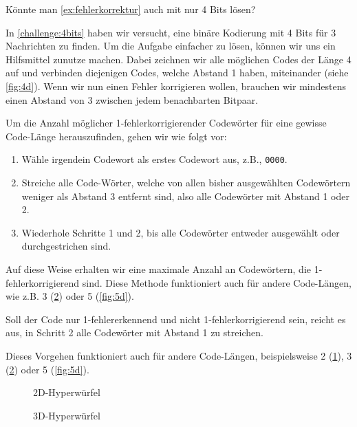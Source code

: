 \begin{mychallenge}\label{challenge:4bits}
    Könnte man \cref{ex:fehlerkorrektur} auch mit nur 4 Bits lösen?
\end{mychallenge}


In \cref{challenge:4bits} haben wir versucht, eine binäre Kodierung mit 4 Bits für 3 Nachrichten zu finden. Um die Aufgabe einfacher zu lösen, können wir uns ein Hilfsmittel zunutze machen. Dabei zeichnen wir alle möglichen Codes der Länge 4 auf und verbinden diejenigen Codes, welche Abstand 1 haben, miteinander (siehe \cref{fig:4d}). Wenn wir nun einen Fehler korrigieren wollen, brauchen wir mindestens einen Abstand von 3 zwischen jedem benachbarten Bitpaar.

\begin{mydefinition}
Um die Anzahl möglicher 1-fehlerkorrigierender Codewörter für eine gewisse Code-Länge herauszufinden, gehen wir wie folgt vor:
\begin{enumerate}
    \item Wähle irgendein Codewort als erstes Codewort aus, z.B., \texttt{0000}.
    \item Streiche alle Code-Wörter, welche von allen bisher ausgewählten Codewörtern weniger als Abstand 3 entfernt sind, also alle Codewörter mit Abstand 1 oder 2.
    \item Wiederhole Schritte 1 und 2, bis alle Codewörter entweder ausgewählt oder durchgestrichen sind.
\end{enumerate}
Auf diese Weise erhalten wir eine maximale Anzahl an Codewörtern, die 1-fehlerkorrigierend sind. Diese Methode funktioniert auch für andere Code-Längen, wie z.B. 3 (\cref{fig:3d}) oder 5 (\cref{fig:5d}).

Soll der Code nur 1-fehlererkennend und nicht 1-fehlerkorrigierend sein, reicht es aus, in Schritt 2 alle Codewörter mit Abstand 1 zu streichen.

Dieses Vorgehen funktioniert auch für andere Code-Längen, beispielsweise 2 (\cref{fig:2d}), 3 (\cref{fig:3d}) oder 5 (\cref{fig:5d}).
\end{mydefinition}

\begin{figure}[H]
    \centering
    \caption{2D-Hyperwürfel}
    \label{fig:2d}
\end{figure}

\begin{figure}[H]
    \centering
    \caption{3D-Hyperwürfel}
    \label{fig:3d}
\end{figure}

